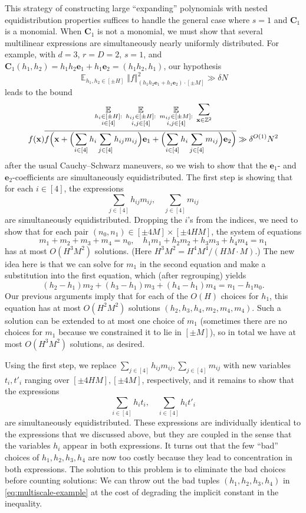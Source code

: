 \documentclass[11pt]{amsart}
\theoremstyle{definition}
\DeclareMathOperator*{\E}{\mathbb{E}}
\newcommand{\bc}{{\textbf{C}}}
\newcommand{\be}{{\mathbf{e}}}
\newcommand{\bx}{{\textbf{x}}}
\newcommand{\norm}[1]{\left\Vert #1\right\Vert}
\newcommand{\Bigbrac}[1]{\Bigl( #1 \Bigr)}
\begin{document}
This strategy of constructing large ``expanding'' polynomials with nested equidistribution properties suffices to handle the general case where $s=1$ and $\bc_1$ is a monomial.  When $\bc_1$ is not a monomial, we must show that several multilinear expressions are simultaneously nearly uniformly distributed.  For example, with $d=3$, $r=D=2$, $s=1$, and $\bc_1(h_1,h_2)=h_1h_2 \be_1+h_1 \be_2=(h_1h_2,h_1)$, our hypothesis
$$\E_{h_1,h_2 \in [\pm H]} \norm{f}^2_{(h_1h_2 \be_1+h_1 \be_2) \cdot [\pm M]} \gg \delta N$$
leads to the bound
\begin{multline}\label{eq:multiscale-example}
\E_{\substack{h_{i} \in [\pm H]:\\ i \in [4]}}\; \E_{\substack{h_{ij}\in [\pm H]:\\ i,j \in [4]}}\;\E_{\substack{m_{ij} \in [\pm M]:\\ i,j \in [4]}}\;\sum_{\bx \in \mathbb{Z}^2}\\
f(\bx) \overline{f\Bigbrac{\bx+\Bigbrac{\sum_{i \in [4]}h_i \sum_{j \in [4]}h_{ij}m_{ij} }\be_1+\Bigbrac{\sum_{i \in [4]}h_i \sum_{j \in [4]}m_{ij}}\be_2}}\gg \delta^{O(1)} N^2
\end{multline}
after the usual Cauchy--Schwarz maneuvers, so we wish to show that the $\be_1$- and $\be_2$-coefficients are simultaneously equidistributed.  The first step is showing that for each $i \in [4]$, the expressions
$$\sum_{j \in [4]}h_{ij}m_{ij}, \quad \sum_{j \in [4]}m_{ij}$$
are simultaneously equidistributed.  Dropping the $i$'s from the indices, we need to show that for each pair $(n_0,n_1) \in [\pm 4M]\times [\pm 4HM]$, the system of equations
$$ m_1+m_2+m_3+m_4=n_0,\quad h_1m_1+h_2m_2+h_3m_3+h_4m_4=n_1$$
has at most $O(H^3M^2)$ solutions.  (Here $H^3M^2=H^4M^4/(H M \cdot M)$.)  The new idea here is that we can solve for $m_1$ in the second equation and make a substitution into the first equation, which (after regrouping) yields
$$(h_2-h_1)m_2+(h_3-h_1)m_3+(h_4-h_1)m_4=n_1-h_1n_0.$$
Our previous arguments imply that for each of the $O(H)$ choices for $h_1$, this equation has at most $O(H^2M^2)$ solutions $(h_2,h_3,h_4,m_2,m_4,m_4)$.  Such a solution can be extended to at most one choice of $m_1$ (sometimes there are no choices for $m_1$ because we constrained it to lie in $[\pm M]$), so in total we have at most $O(H^3M^2)$ solutions, as desired.

Using the first step, we replace $\sum_{j \in [4]}h_{ij}m_{ij}, \sum_{j \in [4]}m_{ij}$ with new variables $t_i,t'_i$ ranging over $[\pm 4HM], [\pm 4M]$, respectively, and it remains to show that the expressions
$$\sum_{i \in [4]} h_i t_i, \quad \sum_{i \in [4]} h_i t'_i$$
are simultaneously equidistributed.  These expressions are individually identical to the expressions that we discussed above, but they are coupled in the sense that the variables $h_i$ appear in both expressions.  It turns out that the few ``bad'' choices of $h_1,h_2,h_3,h_4$ are now too costly because they lead to concentration in both expressions.  The solution to this problem is to eliminate the bad choices before counting solutions: We can throw out the bad tuples $(h_1,h_2,h_3,h_4)$ in \eqref{eq:multiscale-example} at the cost of degrading the implicit constant in the inequality.
\end{document}

